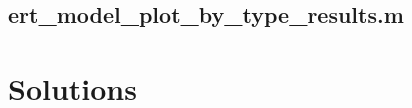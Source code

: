 \subsection{ert\_model\_plot\_by\_type\_results.m\label{app:ert_model_plot_by_type_results}}



\ifDisplaySolutions
\newpage
\appendix
\section{Solutions}

\fi

